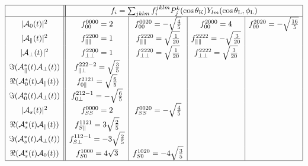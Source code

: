 \documentclass[a4paper,10pt,twosided]{article}
\def\thetaK{\theta_\mathrm{K}}
\def\thetaL{\theta_\mathrm{L}}
\def\phiL{\phi_\mathrm{L}}
\begin{document}
\begin{equation}
\begin{array}{|c|| c | c | c | c | }
 \hline
&\multicolumn{4}{|c|}{ f_i = \sum_{jklm} f_i^{jklm} P_j^k(\cos\thetaK)Y_{lm}(\cos\thetaL,\phiL) } \\
 \hline
|{\cal A}_0(t)|^2                       & f_{00}^{0000} = 2 & f_{00}^{0020} =  -\sqrt{\frac{4}{5}} & f_{00}^{2000} = 4 & f_{00}^{2020}= -\sqrt{\frac{16}{5}}   \\
|{\cal A}_\parallel(t)|^2               & f_{\parallel\parallel}^{2200}=1 &f_{\parallel\parallel}^{2220}=\sqrt{\frac{1}{20}}  & f_{\parallel\parallel}^{2222}=-\sqrt{\frac{3}{20}} & \\
|{\cal A}_\perp(t)|^2                   & f_{\perp\perp}^{2200} = 1 & f_{\perp\perp}^{2220}= \sqrt{\frac{1}{20}}  & f_{\perp\perp}^{2222} = \sqrt{\frac{3}{20}} & \\
\Im({\cal A}_\parallel^*(t){\cal A}_\perp(t)) & f_{\parallel\perp}^{222-2}=\sqrt{\frac{3}{5}}&&&\\
\Re({\cal A}_0^*(t){\cal A}_\parallel(t))     & f_{0\parallel}^{2121}= \sqrt{\frac{6}{5}}&&&\\
\Im({\cal A}_0^*(t){\cal A}_\perp(t))         & f_{0\perp}^{212-1}=-\sqrt{\frac{6}{5}}&&&\\
|{\cal A}_{s}(t)|^2                   & f_{SS}^{0000}=  2  & f_{SS}^{0020}= - \sqrt{\frac{4}{5}}  && \\
\Re({\cal A}_{s}^*(t){\cal A}_\parallel(t))   &  f_{S\parallel}^{1121}=3\sqrt{\frac{2}{5}}  &&& \\
\Im({\cal A}_{s}^*(t){\cal A}_\perp(t))     &  f_{S\perp}^{112-1}= -3\sqrt{\frac{2}{5}} &&& \\
\Re({\cal A}_{s}^*(t){\cal A}_0(t))   & f_{S0}^{1000}= 4 \sqrt{3}  & f_{S0}^{1020}= -4 \sqrt{\frac{3}{5}}  && \\
 \hline
\end{array}
\end{equation}


\pagebreak
\end{document}

